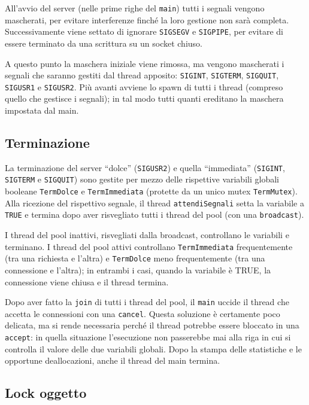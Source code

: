 \documentclass[a4paper,12pt]{article}
\begin{document}
All'avvio del server (nelle prime righe del \texttt{main}) tutti i segnali vengono mascherati, per evitare interferenze finché la loro gestione non sarà completa. Successivamente viene settato di ignorare \texttt{SIGSEGV} e \texttt{SIGPIPE}, per evitare di essere terminato da una scrittura su un socket chiuso.

A questo punto la maschera iniziale viene rimossa, ma vengono mascherati i segnali che saranno gestiti dal thread apposito: \texttt{SIGINT}, \texttt{SIGTERM}, \texttt{SIGQUIT}, \texttt{SIGUSR1} e \texttt{SIGUSR2}. Più avanti avviene lo spawn di tutti i thread (compreso quello che gestisce i segnali); in tal modo tutti quanti ereditano la maschera impostata dal main.

\subsection{ Terminazione }

La terminazione del server ``dolce'' (\texttt{SIGUSR2}) e quella ``immediata'' (\texttt{SIGINT}, \texttt{SIGTERM} e \texttt{SIGQUIT}) sono gestite per mezzo delle rispettive variabili globali booleane \texttt{TermDolce} e \texttt{TermImmediata} (protette da un unico mutex \texttt{TermMutex}). Alla ricezione del rispettivo segnale, il thread \texttt{attendiSegnali} setta la variabile a \texttt{TRUE} e termina dopo aver risvegliato tutti i thread del pool (con una \texttt{broadcast}).

I thread del pool inattivi, risvegliati dalla broadcast, controllano le variabili e terminano. I thread del pool attivi controllano \texttt{TermImmediata} frequentemente (tra una richiesta e l'altra) e \texttt{TermDolce} meno frequentemente (tra una connessione e l'altra); in entrambi i casi, quando la variabile è TRUE, la connessione viene chiusa e il thread termina.

Dopo aver fatto la \texttt{join} di tutti i thread del pool, il \texttt{main} uccide il thread che accetta le connessioni con una \texttt{cancel}. Questa soluzione è certamente poco delicata, ma si rende necessaria perché il thread potrebbe essere bloccato in una \texttt{accept}: in quella situazione l'esecuzione non passerebbe mai alla riga in cui si controlla il valore delle due variabili globali. Dopo la stampa delle statistiche e le opportune deallocazioni, anche il thread del main termina.

\subsection{ Lock oggetto }
\end{document}
